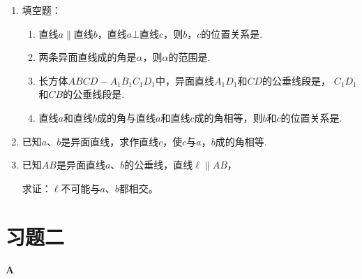 \begin{enumerate}
\begin{figure}[htp]
    \caption*{第1题}
\end{figure}


    \item 填空题：
\begin{enumerate}[(1)]
    \item 直线$a\parallel $直线$b$，直线$a\bot $直线$c$，则$b$，$c$的位置关系是\blank\blank.
 \item 两条异面直线成的角是$\alpha$，则$\alpha$的范围是\blank\blank.
\item 长方体$ABCD-A_1B_1C_1D_1$中，异面直线$A_1D_1$和$CD$的公垂线段是\blank\blank， $C_1D_1$和$CB$的公垂线段是\blank\blank.
\item 直线$a$和直线$b$成的角与直线$a$和直线$c$成的角相等，则$b$和$c$的位置关系是\blank\blank.
\end{enumerate}


\item 已知$a$、$b$是异面直线，求作直线$c$，使$c$与$a$，$b$成的角相等.
\item 已知$AB$是异面直线$a$、$b$的公垂线，直线$\ell\parallel AB$，

求证：$\ell$不可能与$a$、$b$都相交。
\end{enumerate}

\section*{习题二}
\begin{center}
    \bfseries A
\end{center}

